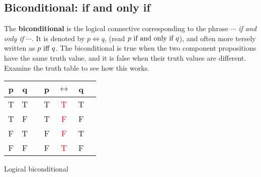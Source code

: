 \subsection{Biconditional: \textbf{\textellipsis if and only if \textellipsis} }
The {\bfseries biconditional} is the logical connective corresponding to the phrase {\itshape $\cdots$ if and only if $\cdots$}. It is denoted by $p\iff q$,
(read {\itshape $p\hbox{ if and only if }q$}), and  often more tersely written as {\itshape $p\hbox{ iff }q$}. The 
biconditional is true when the two component propositions have the same truth value, and it
is false when their truth values are different. Examine the truth table to see how this works.
\begin{margintable}
\begin{tabular}{@{ }c@{ }@{ }c | c@{ }@{ }c@{ }@{ }c@{ }@{ }c@{ }@{ }c}
p & q &  & p & $\longleftrightarrow$ & q & \\
\hline 
T & T &  & T & \textcolor{red}{T} & T & \\
T & F &  & T & \textcolor{red}{F} & F & \\
F & T &  & F & \textcolor{red}{F} & T & \\
F & F &  & F & \textcolor{red}{T} & F & \\
\end{tabular}
\caption{Logical biconditional}
\label{tbl:biconditional}
\end{margintable}


